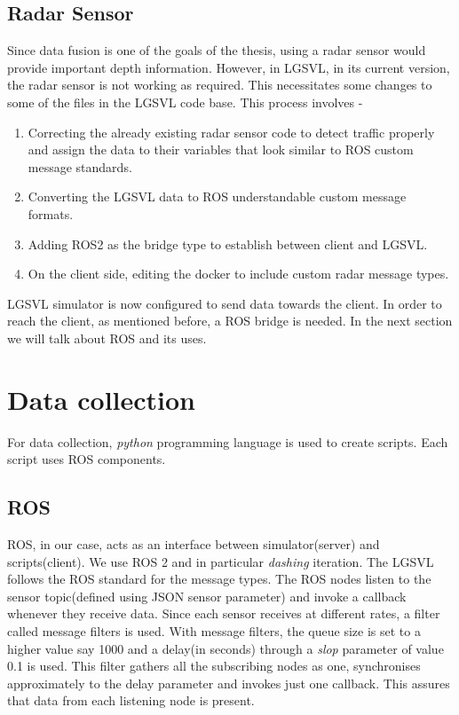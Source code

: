 \subsection{Radar Sensor}
Since data fusion is one of the goals of the thesis, using a radar sensor would provide
important depth information. However, in LGSVL, in its current version, the radar sensor is not working as
required. This necessitates some changes to some of the files in the LGSVL code base.
This process involves -
\begin{enumerate}
    \item Correcting the already existing radar sensor code to detect traffic properly and
        assign the data to their variables that look similar to ROS custom message standards.
    \item Converting the LGSVL data to ROS understandable  custom message formats.
    \item Adding ROS2 as the bridge type to establish between client and LGSVL.
    \item On the client side, editing the docker to include custom radar message types.
\end{enumerate}

LGSVL simulator is now configured to send data towards the client. In order to reach the
client, as mentioned before, a ROS bridge is needed. In the next section we will talk
about ROS and its uses.

\section{Data collection}
For data collection, \textit{python} programming language is used to create scripts. Each
script uses ROS components.

\subsection{ROS}
ROS, in our case, acts as an interface between simulator(server) and scripts(client).
We use ROS 2 and in particular \textit{dashing} iteration. The LGSVL follows the ROS standard for the message types.
The ROS nodes listen to the sensor topic(defined using JSON sensor parameter) and invoke
a callback whenever they receive data. Since each sensor receives at different rates, a
filter called message filters is used. With message filters, the queue size is set to a
higher value say 1000 and a delay(in seconds) through a \textit{slop} parameter of value
0.1 is used. This filter gathers all the subscribing nodes as one, synchronises
approximately to the delay parameter and invokes just one callback. This assures that data
from each listening node is present.

